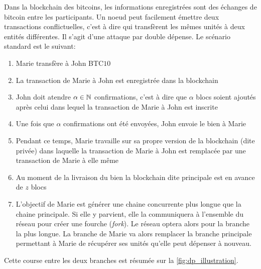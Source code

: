 Dans la blockchain des bitcoins, les informations enregistrées sont des échanges de bitcoin entre les participants. Un noeud peut facilement émettre deux transactions conflictuelles, c'est à dire qui transfèrent les mêmes unités à deux entités différentes. Il s'agit d'une attaque par double dépense. Le scénario standard est le suivant:
\begin{enumerate}
    \item Marie transfère à John BTC$10$
    \item La transaction de Marie à John est enregistrée dans la blockchain
    \item John doit atendre $\alpha\in\mathbb{N}$ confirmations, c'est à dire que $\alpha$ blocs soient ajoutés après celui dans lequel la transaction de Marie à John est inscrite
    \item Une fois que $\alpha$ confirmations ont été envoyées, John envoie le bien à Marie
    \item Pendant ce temps, Marie travaille sur sa propre version de la blockchain (dite privée) dans laquelle la transaction de Marie à John est remplacée par une transaction de Marie à elle même
    \item Au moment de la livraison du bien la blockchain dite principale est en avance de $z$ blocs 
    \item L'objectif de Marie est générer une chaine concurrente plus longue que la chaine principale. Si elle y parvient, elle la communiquera à l'ensemble du réseau pour créer une fourche (\textit{fork}). Le réseau optera alors pour la branche la plus longue.
    La branche de Marie va alors remplacer la branche principale permettant à Marie de récupérer ses unités qu'elle peut dépenser à nouveau. 
\end{enumerate}
Cette course entre les deux branches est résumée sur la \cref{fig:dp_illustration}.

